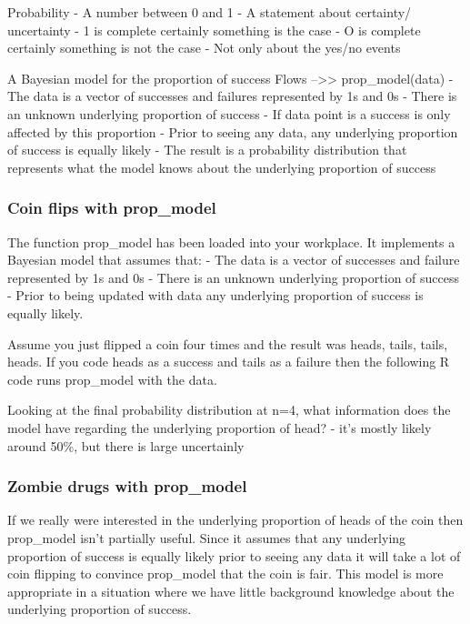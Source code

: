 \documentclass[
]{article}
\begin{document}
Probability - A number between 0 and 1 - A statement about certainty/
uncertainty - 1 is complete certainly something is the case - O is
complete certainly something is not the case - Not only about the yes/no
events

A Bayesian model for the proportion of success Flows
--\textgreater\textgreater{} prop\_model(data) - The data is a vector of
successes and failures represented by 1s and 0s - There is an unknown
underlying proportion of success - If data point is a success is only
affected by this proportion - Prior to seeing any data, any underlying
proportion of success is equally likely - The result is a probability
distribution that represents what the model knows about the underlying
proportion of success

\hypertarget{coin-flips-with-prop_model}{%
\subsubsection{Coin flips with
prop\_model}\label{coin-flips-with-prop_model}}

The function prop\_model has been loaded into your workplace. It
implements a Bayesian model that assumes that: - The data is a vector of
successes and failure represented by 1s and 0s - There is an unknown
underlying proportion of success - Prior to being updated with data any
underlying proportion of success is equally likely.

Assume you just flipped a coin four times and the result was heads,
tails, tails, heads. If you code heads as a success and tails as a
failure then the following R code runs prop\_model with the data.

Looking at the final probability distribution at n=4, what information
does the model have regarding the underlying proportion of head? - it's
mostly likely around 50\%, but there is large uncertainly

\hypertarget{zombie-drugs-with-prop_model}{%
\subsubsection{Zombie drugs with
prop\_model}\label{zombie-drugs-with-prop_model}}

If we really were interested in the underlying proportion of heads of
the coin then prop\_model isn't partially useful. Since it assumes that
any underlying proportion of success is equally likely prior to seeing
any data it will take a lot of coin flipping to convince prop\_model
that the coin is fair. This model is more appropriate in a situation
where we have little background knowledge about the underlying
proportion of success.
\end{document}
